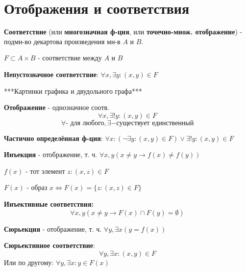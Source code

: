 \section{Отображения и соответствия}
\begin{definition}
\textbf{Соответствие} (или \textbf{многозначная ф-ция}, или \textbf{точечно-множ. отображение}) - подмн-во декартова произведения мн-в $A$ и $B$.

$F \subset A \times B$ - соответствие между $A$ и $B$
\end{definition}
\begin{note}
\textbf{Непустозначное соответствие}: $\forall x, \exists y \colon  (x, y) \in F$
\end{note}

***Картинки графика и двудольного графа***

\begin{definition}
\textbf{Отображение} - однозначное соотв.
\[
\forall x, \exists! y\colon (x, y) \in F
\] 
\[
\forall \text{- для любого}, \exists - \text{существует единственный}
\] 
\end{definition}
\begin{definition}
\textbf{Частично определённая ф-ция}: $\forall x \colon (\neg \exists y \colon (x, y) \in F) \lor \exists ! y \colon  (x, y) \in F$
\end{definition}
\begin{definition}
\textbf{Инъекция} - отображение, т. ч. $\forall x, y (x \neq y \rightarrow f(x) \neq f(y))$
\end{definition}
\begin{definition}
    \textbf{$f(x)$} - тот элемент $z \colon (x, z) \in F$
\end{definition}
\begin{definition}
    $F(x)$ - образ $x \iff F(x) = \{z \colon (x, z) \in F\}$
\end{definition}
\begin{definition}
    \textbf{Инъективные соответствия:}
    \[
    \forall x, y (x \neq y \rightarrow F(x) \cap F(y) = \emptyset)
    \] 
\end{definition}
\begin{definition}
    \textbf{Сюрьекция} - отображение, т. ч. $\forall y, \exists x (y = f(x))$
\end{definition}
\begin{definition}
    \textbf{Сюрьективное соответствие}:
    \[
    \forall y, \exists x \colon  (x, y) \in F
    \] 
    Или по другому: $\forall y, \exists x \colon y \in F(x) $
\end{definition}

